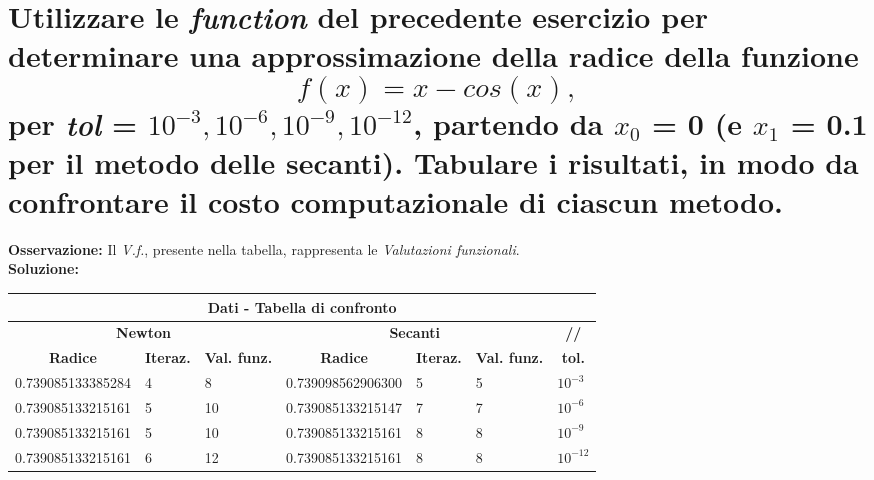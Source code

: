 \documentclass[10pt,a4paper]{article}
\begin{document}
\section{Utilizzare le \textit{function} del precedente esercizio per determinare una approssimazione
  della radice della funzione $$ f(x) = x - cos(x), $$ per \textit{tol} = $ 10^{-3}, 10^{-6}, 10^{-9}, 10^{-12} $,
  partendo da $ x_0 $ = 0 (e $ x_1 $ = 0.1 per il metodo delle secanti).
  Tabulare i risultati, in modo da confrontare il costo computazionale di ciascun metodo.}
\textbf{Osservazione:} Il \textit{V.f.}, presente nella tabella, rappresenta le \textit{Valutazioni funzionali}.\\
\textbf{Soluzione:}
\begin{center}
  \setlength\tabcolsep{2pt}
  \begin{tabular}{|p{3.5cm} | p{1cm} | p{1cm} | p{3.5cm} | p{1cm} | p{1cm} | p{1cm}|}
    \hline
    \multicolumn{7}{|c|}{\textbf{Dati - Tabella di confronto}}                                                                                                                                    \\
    \hline
    \multicolumn{3}{|c|}{\textbf{Newton}} & \multicolumn{3}{|c|}{\textbf{Secanti}} & \multicolumn{1}{c|}{\textbf{//}}                                                                             \\
    \hline
    \multicolumn{1}{|c|}{\textbf{Radice}} & \multicolumn{1}{|c|}{\textbf{Iteraz.}} & \multicolumn{1}{|c|}{\textbf{Val. funz.}}
                                          & \multicolumn{1}{|c|}{\textbf{Radice}}  & \multicolumn{1}{|c|}{\textbf{Iteraz.}}    & \multicolumn{1}{|c|}{\textbf{Val. funz.}}
                                          & \multicolumn{1}{c|}{\textbf{tol.}}                                                                                                                    \\
    \hline
    0.739085133385284                     & 4                                      & 8                                         & 0.739098562906300                         & 5 & 5 & $ 10^{-3} $  \\
    0.739085133215161                     & 5                                      & 10                                        & 0.739085133215147                         & 7 & 7 & $ 10^{-6} $  \\
    0.739085133215161                     & 5                                      & 10                                        & 0.739085133215161                         & 8 & 8 & $ 10^{-9} $  \\
    0.739085133215161                     & 6                                      & 12                                        & 0.739085133215161                         & 8 & 8 & $ 10^{-12} $ \\
    \hline
  \end{tabular}
  \newline
\end{center}
\end{document}

